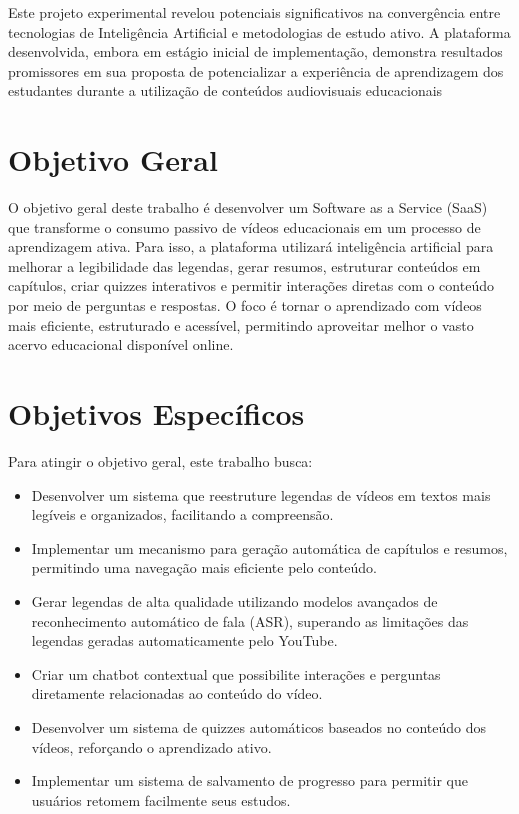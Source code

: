 \documentclass[tcc,capa]{texufpel}
\begin{document}
Este projeto experimental revelou potenciais significativos na convergência entre tecnologias de Inteligência Artificial e metodologias de estudo ativo. A plataforma desenvolvida, embora em estágio inicial de implementação, demonstra resultados promissores em sua proposta de potencializar a experiência de aprendizagem dos estudantes durante a utilização de conteúdos audiovisuais educacionais


\section{Objetivo Geral}
O objetivo geral deste trabalho é desenvolver um Software as a Service (SaaS) que transforme o consumo passivo de vídeos educacionais em um processo de aprendizagem ativa. Para isso, a plataforma utilizará inteligência artificial para melhorar a legibilidade das legendas, gerar resumos, estruturar conteúdos em capítulos, criar quizzes interativos e permitir interações diretas com o conteúdo por meio de perguntas e respostas. O foco é tornar o aprendizado com vídeos mais eficiente, estruturado e acessível, permitindo aproveitar melhor o vasto acervo educacional disponível online.
\section{Objetivos Específicos}

Para atingir o objetivo geral, este trabalho busca:

\begin{itemize}
    \item Desenvolver um sistema que reestruture legendas de vídeos em textos mais legíveis e organizados, facilitando a compreensão.
    \item Implementar um mecanismo para geração automática de capítulos e resumos, permitindo uma navegação mais eficiente pelo conteúdo.
    \item Gerar legendas de alta qualidade utilizando modelos avançados de reconhecimento automático de fala (ASR), superando as limitações das legendas geradas automaticamente pelo YouTube.
    \item Criar um chatbot contextual que possibilite interações e perguntas diretamente relacionadas ao conteúdo do vídeo.
    \item Desenvolver um sistema de quizzes automáticos baseados no conteúdo dos vídeos, reforçando o aprendizado ativo.
    \item Implementar um sistema de salvamento de progresso para permitir que usuários retomem facilmente seus estudos.
\end{itemize}
\end{document}
